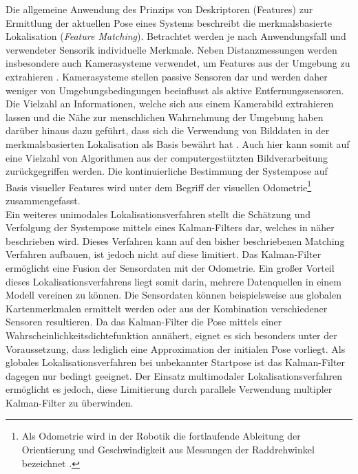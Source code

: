 Die allgemeine Anwendung des Prinzips von Deskriptoren (Features) zur Ermittlung der aktuellen Pose eines Systems beschreibt die merkmalsbasierte Lokalisation (\textit{Feature Matching}). Betrachtet werden je nach Anwendungsfall und verwendeter Sensorik individuelle Merkmale. Neben Distanzmessungen \cite{Tomono2004} werden insbesondere auch Kamerasysteme verwendet, um Features aus der Umgebung zu extrahieren \cite{Se2001}. Kamerasysteme stellen passive Sensoren dar und werden daher weniger von Umgebungsbedingungen beeinflusst als aktive Entfernungssensoren. Die Vielzahl an Informationen, welche sich aus einem Kamerabild extrahieren lassen und die Nähe zur menschlichen Wahrnehmung der Umgebung haben darüber hinaus dazu geführt, dass sich die Verwendung von Bilddaten in der merkmalsbasierten Lokalisation als Basis bewährt hat \cite{Wolf2002}. Auch hier kann somit auf eine Vielzahl von Algorithmen aus der computergestützten Bildverarbeitung zurückgegriffen werden. Die kontinuierliche Bestimmung der Systempose auf Basis visueller Features wird unter dem Begriff der visuellen Odometrie\footnote{Als Odometrie wird in der Robotik die fortlaufende Ableitung der Orientierung und Geschwindigkeit aus Messungen der Raddrehwinkel bezeichnet \cite{Hertzberg2012}.} \cite{Mccarthy2003} zusammengefasst.\\

Ein weiteres unimodales Lokalisationsverfahren stellt die Schätzung und Verfolgung der Systempose mittels eines Kalman-Filters \cite{Kalman1960} dar, welches in  näher beschrieben wird. Dieses Verfahren kann auf den bisher beschriebenen Matching Verfahren aufbauen, ist jedoch nicht auf diese limitiert. Das Kalman-Filter ermöglicht eine Fusion der Sensordaten mit der Odometrie. Ein großer Vorteil dieses Lokalisationsverfahrens liegt somit darin, mehrere Datenquellen in einem Modell vereinen zu können. Die Sensordaten können beispielsweise aus globalen Kartenmerkmalen ermittelt werden \cite{Leonard1991} oder aus der Kombination verschiedener Sensoren \cite{Roumeliotis1997} resultieren. Da das Kalman-Filter die Pose mittels einer Wahrscheinlichkeitsdichtefunktion annähert, eignet es sich besonders unter der Voraussetzung, dass lediglich eine Approximation der initialen Pose vorliegt. Als globales Lokalisationsverfahren bei unbekannter Startpose ist das Kalman-Filter dagegen nur bedingt geeignet. Der Einsatz multimodaler Lokalisationsverfahren ermöglicht es jedoch, diese Limitierung durch parallele Verwendung multipler Kalman-Filter zu überwinden.

